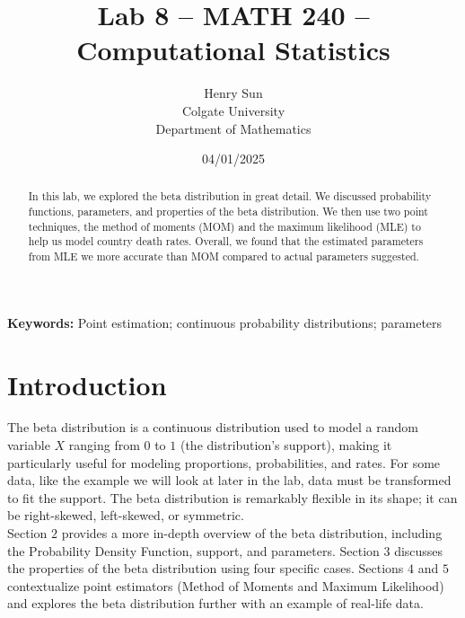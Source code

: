 \documentclass{article}\usepackage[]{graphicx}\usepackage[]{xcolor}
\begin{document}
\vspace{-1in}
\title{Lab 8 -- MATH 240 -- Computational Statistics}

\author{
  Henry Sun \\
  Colgate University  \\
  Department of Mathematics  \\
  {\tt }
}

\date{04/01/2025}

\maketitle

\begin{multicols}{2}\raggedcolumns
\begin{abstract}
In this lab, we explored the beta distribution in great detail. We discussed probability functions, parameters, and properties of the beta distribution. We then use two point techniques, the method of moments (MOM) and the maximum likelihood (MLE) to help us model country death rates. Overall, we found that the estimated parameters from MLE we more accurate than MOM compared to actual parameters suggested. 
\end{abstract}

\noindent \textbf{Keywords:} Point estimation; continuous probability distributions; parameters

\section{Introduction}
The beta distribution is a continuous distribution used to model a random variable $X$ ranging from $0$ to $1$ (the distribution's support), making it particularly useful for modeling proportions, probabilities, and rates. For some data, like the example we will look at later in the lab, data must be transformed to fit the support. The beta distribution is remarkably flexible in its shape; it can be right-skewed, left-skewed, or symmetric. \\
\indent Section $2$ provides a more in-depth overview of the beta distribution, including the Probability Density Function, support, and parameters. Section $3$ discusses the properties of the beta distribution using four specific cases. Sections $4$ and $5$ contextualize point estimators (Method of Moments and Maximum Likelihood) and explores the beta distribution further with an example of real-life data. 


\end{multicols}
\end{document}
